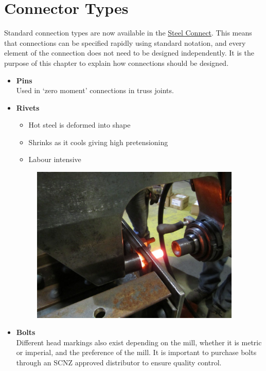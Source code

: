 \section{Connector Types}
Standard connection types are now available in the \href{https://www.scnz.org/techincal-resources/connections-guide/}{Steel Connect}. This means that connections can be specified rapidly using standard notation, and every element of the connection does not need to be designed independently. It is the purpose of this chapter to explain how connections should be designed.
\begin{itemize}
\item \textbf{Pins}\\Used in `zero moment' connections in truss joints.
\item \textbf{Rivets}
\begin{itemize}
\item Hot steel is deformed into shape
\item Shrinks as it cools giving high pretensioning
\item Labour intensive
\end{itemize}
\begin{figure}[H]
\centering
\includegraphics[width=10cm]{PIC/CH06/RI}
\end{figure}
\item \textbf{Bolts}\\
Different head markings also exist depending on the mill, whether it is metric or imperial, and the preference of the mill. It is important to purchase bolts through an SCNZ approved distributor to ensure quality control.


\end{itemize}
